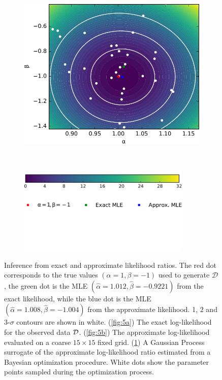 \documentclass[12pt]{article}
\numberwithin{equation}{section}
\theoremstyle{plain}
\begin{document}
\begin{figure}
    \begin{subfigure}[t]{0.45\textwidth}
        \centering
        \includegraphics[width=\textwidth]{figures/fig5c.pdf}
        \caption{ }
        \label{fig:5c}
    \end{subfigure}
    ~
    \begin{subfigure}[t]{0.45\textwidth}
        \centering
        \hfill\includegraphics[width=0.9\textwidth]{figures/fig5d.pdf}
        \caption{ }
        \label{fig:5d}
    \end{subfigure}
    \caption{Inference from exact and approximate likelihood ratios. The red dot corresponds
    to the true values $(\alpha=1, \beta=-1)$ used to generate $\mathcal{D}$, the green dot is the MLE
    $(\hat \alpha=1.012, \hat \beta=-0.9221)$  from the exact likelihood, while the blue dot is the MLE $(\hat \alpha=1.008, \hat \beta=-1.004)$ from the approximate likelihood.
    1, 2 and 3-$\sigma$ contours are shown in white.
             (\ref{fig:5a}) The exact log-likelihood for the observed data ${\cal D}$.
             (\ref{fig:5b}) The approximate log-likelihood  evaluated on a coarse $15 \times 15$ fixed grid.
             (\ref{fig:5c}) A Gaussian Process surrogate of the approximate log-likelihood ratio estimated from a Bayesian optimization procedure. White dots show the  parameter points sampled during the optimization process.}
    \label{fig:5}
\end{figure}
\end{document}
